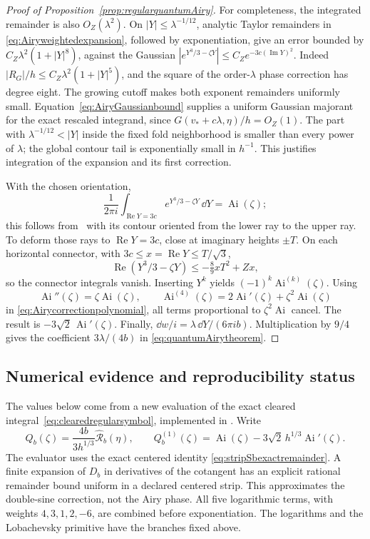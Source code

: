 \begin{proof}[Proof of Proposition~\ref{prop:regularquantumAiry}]
For completeness, the integrated remainder is also
$O_Z(\lambda^2)$. On
$|Y|\le\lambda^{-1/12}$, analytic Taylor remainders in
\eqref{eq:Airyweightedexpansion}, followed by exponentiation,
give an error bounded by
$C_Z\lambda^2(1+|Y|^8)$, against the Gaussian
$|e^{Y^3/3-\zeta Y}|\le C_Ze^{-3c(\operatorname{Im}Y)^2}$.
Indeed $|R_G|/h\le C_Z\lambda^2(1+|Y|^5)$, and the
square of the order-$\lambda$ phase correction has degree
eight. The growing cutoff makes both exponent remainders
uniformly small.
Equation~\eqref{eq:AiryGaussianbound} supplies a uniform
Gaussian majorant for the exact rescaled integrand, since
$G(v_*+c\lambda,\eta)/h=O_Z(1)$. The part with
$\lambda^{-1/12}<|Y|$ inside the fixed fold neighborhood
is smaller than every power of $\lambda$; the global contour
tail is exponentially small in $h^{-1}$. This justifies
integration of the expansion and its first correction.

With the chosen orientation,
\[
 \frac1{2\pi i}\int_{\operatorname{Re}Y=3c}
       e^{Y^3/3-\zeta Y}\,\dd Y=\operatorname{Ai}(\zeta);
\]
this follows from~\cite[(9.5.4)]{DLMF} with its contour
oriented from the lower ray to the upper ray. To deform those
rays to $\operatorname{Re}Y=3c$, close at imaginary heights
$\pm T$. On each horizontal connector, with
$3c\le x=\operatorname{Re}Y\le T/\sqrt3$,
\[
 \operatorname{Re}(Y^3/3-\zeta Y)
 \le-\tfrac89xT^2+Zx,
\]
so the connector integrals vanish. Inserting $Y^k$ yields
$(-1)^k\operatorname{Ai}^{(k)}(\zeta)$.
Using
\[
 \operatorname{Ai}''(\zeta)=\zeta\operatorname{Ai}(\zeta),
 \qquad
 \operatorname{Ai}^{(4)}(\zeta)
       =2\operatorname{Ai}'(\zeta)
          +\zeta^2\operatorname{Ai}(\zeta)
\]
in \eqref{eq:Airycorrectionpolynomial}, all terms proportional
to $\zeta^2\operatorname{Ai}$ cancel. The result is
$-3\sqrt2\,\operatorname{Ai}'(\zeta)$.
Finally,
$\dd w/i=\lambda\,\dd Y/(6\pi i b)$.
Multiplication by $9/4$ gives the coefficient
$3\lambda/(4b)$ in \eqref{eq:quantumAirytheorem}.
\end{proof}

\subsection{Numerical evidence and reproducibility status}

The values below come from a new evaluation of the exact cleared
integral~\eqref{eq:clearedregularsymbol}, implemented in
. Write
\[
 Q_b(\zeta)=\frac{4b}{3h^{1/3}}\widehat{\mathcal R}_b(\eta),
 \qquad
 Q_b^{(1)}(\zeta)=\operatorname{Ai}(\zeta)
       -3\sqrt2\,h^{1/3}\operatorname{Ai}'(\zeta).
\]
The evaluator uses the exact centered identity
\eqref{eq:stripSbexactremainder}. A finite expansion of $D_b$
in derivatives of the cotangent has an explicit rational
remainder bound uniform in a declared centered strip. This
approximates the double-sine correction, not the Airy phase.
All five logarithmic terms, with weights $4,3,1,2,-6$, are
combined before exponentiation. The logarithms and the
Lobachevsky primitive have the branches fixed above.


